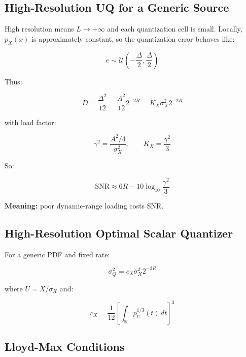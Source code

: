 \subsection{High-Resolution UQ for a Generic Source}

High resolution means $L\to+\infty$ and each quantization cell is small. Locally, $p_X(x)$ is approximately constant, so the quantization error behaves like:

\[
e\sim\mathcal{U}\left(-\frac{\Delta}{2},\frac{\Delta}{2}\right)
\]

Thus:

\[
D=\frac{\Delta^2}{12}
=\frac{A^2}{12}2^{-2R}
=K_X\sigma_X^2 2^{-2R}
\]

with load factor:

\[
\gamma^2=\frac{A^2/4}{\sigma_X^2}, \qquad K_X=\frac{\gamma^2}{3}
\]

So:

\[
\mathrm{SNR}\approx 6R-10\log_{10}\frac{\gamma^2}{3}
\]

\textbf{Meaning:} poor dynamic-range loading costs SNR.

\subsection{High-Resolution Optimal Scalar Quantizer}

For a generic PDF and fixed rate:

\[
\sigma_Q^2=c_X\sigma_X^2 2^{-2R}
\]

where $U=X/\sigma_X$ and:

\[
c_X=\frac{1}{12}\left[\int_{\mathbb{R}}p_U^{1/3}(t)\,dt\right]^3
\]

\begin{center}
\end{center}

\subsection{Lloyd-Max Conditions}

